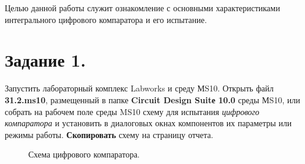 \documentclass[bachelor, och, otchet, hidelinks]{SCWorks}
\begin{document}


\tableofcontents






\intro

\par Целью данной работы служит ознакомление с основными характеристиками интегрального цифрового 
компаратора и его испытание.

\newpage

\section*{Задание 1.}

\par Запустить лабораторный комплекс Labworks и среду МS10. Открыть файл \textbf{31.2.ms10}, размещенный в папке
\textbf{Circuit Design Suitе 10.0} среды МS10, или собрать на рабочем поле среды MS10 схему для испытания 
\textit{цифрового компаратора} и установить в диалоговых окнах компонентов их параметры или режимы работы. 
\textbf{Скопировать} схему на страницу отчета.

\begin{figure}[h]
	\caption{Схема цифрового компаратора.}
\end{figure}
\end{document}
